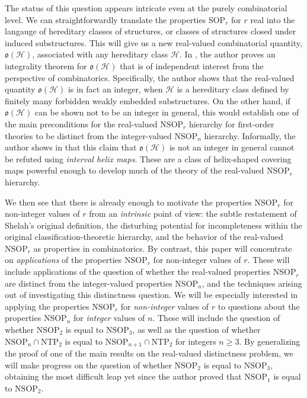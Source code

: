 \documentclass{amsart}
\theoremstyle{definition}
\theoremstyle{remark}
\numberwithin{equation}{section}
\begin{document}
The status of this question appears intricate even at the purely combinatorial level. We can straightforwardly translate the properties $\mathrm{SOP}_{r}$ for $r$ real into the langauge of hereditary classes of structures, or classes of structures closed under induced substructures. This will give us a new real-valued combinatorial quantity, $\mathfrak{o}(\mathcal{H})$, associated with any hereditary class $\mathcal{H}$. In \cite{ApproxOrder}, the author proves an integrality theorem for $\mathfrak{o}(\mathcal{H})$ that is of independent interest from the perspective of combinatorics. Specifically, the author shows that the real-valued quantity $\mathfrak{o}(\mathcal{H})$ is in fact an integer, when $\mathcal{H}$ is a hereditary class defined by finitely many forbidden weakly embedded substructures. On the other hand, if $\mathfrak{o}(\mathcal{H})$ can be shown not to be an integer in general, this would establish one of the main preconditions for the real-valued $\mathrm{NSOP}_{r}$ hierarchy for first-order theories to be distinct from the integer-valued $\mathrm{NSOP}_{n}$ hierarchy. Informally, the author shows in \cite{ApproxOrder} that this claim that $\mathfrak{o}(\mathcal{H})$ is not an integer
in general cannot be refuted using \textit{interval helix maps}. These are a class of helix-shaped covering maps powerful enough to develop much of the theory of the real-valued $\mathrm{NSOP}_{r}$ hierarchy.

We then see that there is already enough to motivate the properties $\mathrm{NSOP}_{r}$ for non-integer values of $r$ from an \textit{intrinsic} point of view: the subtle restatement of Shelah's original definition, the disturbing potential for incompleteness within the original classification-theoretic hierarchy, and the behavior of the real-valued $\mathrm{NSOP}_{r}$ as properties in combinatorics. By contrast, this paper will concentrate on \textit{applications} of the properties $\mathrm{NSOP}_{r}$ for non-integer values of $r$. These will include applications of the question of whether the real-valued properties $\mathrm{NSOP}_{r}$ are distinct from the integer-valued properties $\mathrm{NSOP}_{n}$, and the techniques arising out of investigating this distinctness question. We will be especially interested in applying the properties $\mathrm{NSOP}_{r}$ for \textit{non-integer} values of $r$ to questions about the properties $\mathrm{NSOP}_{n}$ for \textit{integer} values of $n$. These will include the question of whether $\mathrm{NSOP}_{2}$ is equal to $\mathrm{NSOP}_{3}$, as well as the question of whether $\mathrm{NSOP}_{n} \cap \mathrm{NTP}_{2}$ is equal to $\mathrm{NSOP}_{n+1} \cap \mathrm{NTP}_{2}$ for integers $n \geq 3$. By generalizing the proof of one of the main results on the real-valued distinctness problem, we will make progress on the question of whether $\mathrm{NSOP}_{2}$ is equal to $\mathrm{NSOP}_{3}$, obtaining the most difficult leap yet since the author proved that $\mathrm{NSOP}_{1}$ is equal to $\mathrm{NSOP}_{2}$. 
\end{document}
